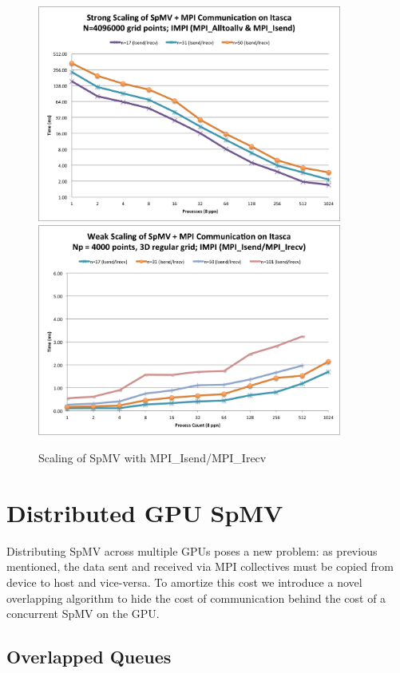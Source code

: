 \documentclass{report}
\begin{document}
\begin{figure}
\centering
\includegraphics[width=10cm]{performance_content/scaling/strong_scaling_4M_regular_isend.png}  
\includegraphics[width=10cm]{performance_content/scaling/weak_scaling_np4000_regular_isend.png}  
\caption{Scaling of SpMV with MPI\_Isend/MPI\_Irecv}
\end{figure}


\chapter{Distributed GPU SpMV}


Distributing SpMV across multiple GPUs poses a new problem: as previous mentioned, the data sent and received via MPI collectives must be copied from device to host and vice-versa. To amortize this cost we introduce a novel overlapping algorithm to hide the cost of communication behind the cost of a concurrent SpMV on the GPU. 

\section{Overlapped Queues}
\end{document}
